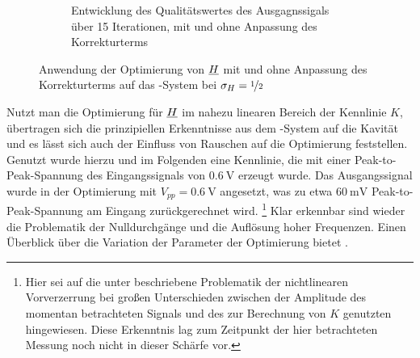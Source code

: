 \documentclass[../Report.tex]{subfiles}
\begin{document}
\begin{figure}[H]
\begin{subfigure}{\textwidth}
\caption{Entwicklung des Qualitätswertes des Ausgagnssigals über 15 Iterationen, mit und ohne Anpassung des Korrekturterms}
	\label{subfig:opt.H.mockQuality}
\end{subfigure}
\caption[Optimierung von $\Hcompl$ im \mock-System]{Anwendung der Optimierung von $\Hcompl$ mit und ohne Anpassung des Korrekturterms auf das \mock-System bei $\sigma_H = \nicefrac{1}{2}$}
\end{figure}


Nutzt man die Optimierung für $\Hcompl$ im nahezu linearen Bereich der Kennlinie $K$, übertragen sich die prinzipiellen Erkenntnisse aus dem \mock-System  auf die Kavität und es lässt sich auch der Einfluss von Rauschen auf die Optimierung feststellen. Genutzt wurde hierzu und im Folgenden eine Kennlinie, die mit einer Peak-to-Peak-Spannung des Eingangssignals von $\SI{0.6}{\volt}$ erzeugt wurde. Das Ausgangssignal wurde in der Optimierung mit $V_{pp} = \SI{0.6}{\volt}$ angesetzt, was zu etwa $\SI{60}{\milli\volt}$ Peak-to-Peak-Spannung am Eingang zurückgerechnet wird. 
\footnote{Hier sei auf die unter\textit{} beschriebene Problematik der nichtlinearen Vorverzerrung bei großen Unterschieden zwischen der Amplitude des momentan betrachteten Signals und des zur Berechnung von $K$ genutzten hingewiesen. Diese Erkenntnis lag zum Zeitpunkt der hier betrachteten Messung noch nicht in dieser Schärfe vor.}
Klar erkennbar sind wieder die Problematik der Nulldurchgänge und die Auflösung hoher Frequenzen.
Einen Überblick über die Variation der Parameter der Optimierung bietet . 
\end{document}
